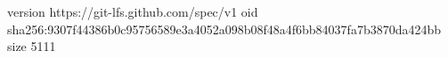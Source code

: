 version https://git-lfs.github.com/spec/v1
oid sha256:9307f44386b0c95756589e3a4052a098b08f48a4f6bb84037fa7b3870da424bb
size 5111

